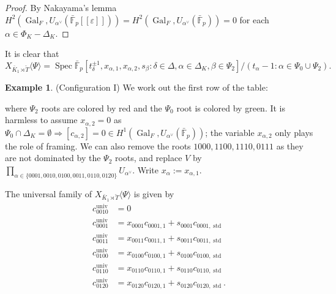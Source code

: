 \documentclass[11pt]{amsart}
\theoremstyle{definition}
\newtheorem{example}[thm]{Example}
\newcommand{\bFp}{\bar{\mathbb{F}}_p}
\newcommand{\bT}{\breve{T}}
\newcommand{\univ}{{\operatorname{univ}}}
\DeclareMathOperator{\std}{std}
\DeclareMathOperator{\Spec}{Spec}
\DeclareMathOperator{\Gal}{Gal}
\begin{document}
\begin{proof}
By Nakayama's lemma
$H^2(\Gal_F, U_{\alpha^\vee}(\bFp[\![\varepsilon]\!]))
=H^2(\Gal_F, U_{\alpha^\vee}(\bFp))=0$
for each $\alpha\in \Phi_K -\Delta_K$.
\end{proof}

It is clear that
\[
X_{\bar K_1\rtimes\bT}\langle\Psi\rangle
=\Spec \bFp[t_\delta^{\pm1}, x_{\alpha,1}, x_{\alpha,2},
s_{\beta}:
\delta\in \Delta, \alpha\in \Delta_K,
\beta\in \Psi_2]/
(t_\alpha-1: \alpha\in \Psi_0\cup\Psi_2).
\]

\begin{example} (Configuration I)
We work out the first row of the table:

\begin{figure}[H]
\scalebox{.6}{\StratumK}
\end{figure}

\noindent
where $\Psi_2$ roots are colored by red
and the $\Psi_0$ root is colored by green.
It is harmless to assume
$x_{\alpha,2}=0$
as $\Psi_0\cap \Delta_K=\emptyset
\Rightarrow
[c_{\alpha,2}]=0\in H^1(\Gal_F, U_{\alpha^\vee}(\bFp))$;
the variable $x_{\alpha,2}$
only plays the role of framing.
We can also remove the roots $1000,1100,1110,0111$
as they are not dominated by the $\Psi_2$ roots,
and replace
$V$ by $\prod_{\alpha\in \{0001,0010,0100,0011,0110,0120\}}
U_{\alpha^\vee}$.
Write $x_{\alpha}:=x_{\alpha,1}$.

The universal family of $X_{\bar K_1\rtimes \bT}\langle \Psi\rangle$
is given by
\begin{align*}
c^{\univ}_{0010} &= 0 \\
c^{\univ}_{0001} &= x_{0001}c_{0001,1}
+ s_{0001}c_{0001,\std}\\
c^{\univ}_{0011} &= x_{0011}c_{0011,1}
+ s_{0011}c_{0011,\std}\\
c^{\univ}_{0100} &= x_{0100}c_{0100,1}
+ s_{0100}c_{0100,\std}\\
c^{\univ}_{0110} &= x_{0110}c_{0110,1}
+ s_{0110}c_{0110,\std}\\
c^{\univ}_{0120} &= x_{0120}c_{0120,1}
+ s_{0120}c_{0120,\std}.
\end{align*}


\end{example}
\end{document}
